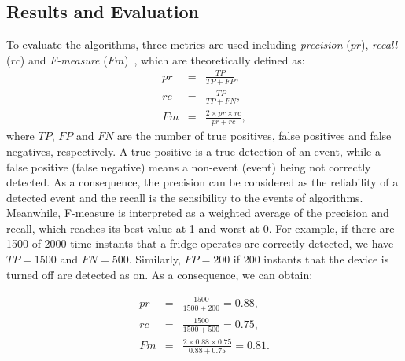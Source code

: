\subsection{Results and Evaluation}\label{resultl1}
To evaluate the algorithms, three metrics are used including \textit{precision} ($pr$), \textit{recall} ($rc$) and \textit{F-measure} ($Fm$)~\cite{Olson2008}, which are theoretically defined as:
\begin{eqnarray}\label{eva-metrics}
pr &=& \frac{TP}{TP+FP},\\
rc &=& \frac{TP}{TP+FN},\\
Fm &=& \frac{2\times pr \times rc}{pr+rc},
\end{eqnarray}
where $TP$, $FP$ and $FN$ are the number of true positives, false positives and false negatives, respectively. A true positive is a true detection of an event, while a false positive (false negative) means a non-event (event) being not correctly detected. As a consequence, the precision can be considered as the reliability of a detected event and the recall is the sensibility to the events of algorithms. Meanwhile, F-measure is interpreted as a weighted average of the precision and recall, which reaches its best value at 1 and worst at 0. For example, if there are 1500 of 2000 time instants that a fridge operates are correctly detected, we have $TP=1500$ and $FN=500$. Similarly, $FP = 200$ if 200 instants that the device is turned off are detected as on. As a consequence, we can obtain:

\begin{eqnarray*}
pr &=& \frac{1500}{1500+200} = 0.88,\\
rc &=& \frac{1500}{1500+500} = 0.75,\\
Fm &=& \frac{2\times 0.88 \times 0.75}{0.88+0.75} = 0.81.
\end{eqnarray*}


